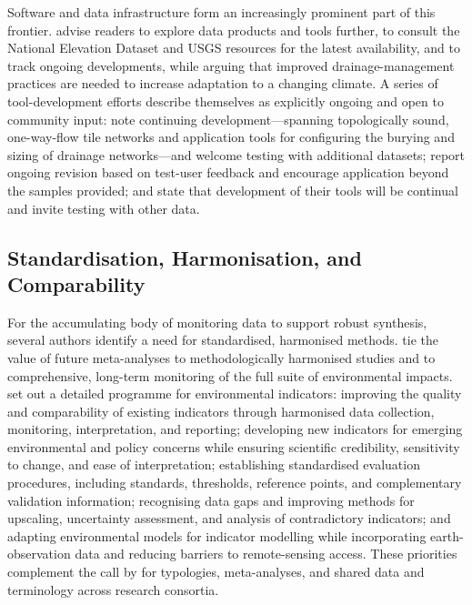 \documentclass[11pt]{article}
\begin{document}
Software and data infrastructure form an increasingly prominent part of this frontier. \textcite{Shedekar2018} advise readers to explore data products and tools further, to consult the National Elevation Dataset and USGS resources for the latest availability, and to track ongoing developments, while arguing that improved drainage-management practices are needed to increase adaptation to a changing climate. A series of tool-development efforts describe themselves as explicitly ongoing and open to community input: \textcite{Falasy2025} note continuing development---spanning topologically sound, one-way-flow tile networks and application tools for configuring the burying and sizing of drainage networks---and welcome testing with additional datasets; \textcite{Falasy2025b} report ongoing revision based on test-user feedback and encourage application beyond the samples provided; and \textcite{Falasy2024} state that development of their tools will be continual and invite testing with other data.

\subsection{Standardisation, Harmonisation, and Comparability}

For the accumulating body of monitoring data to support robust synthesis, several authors identify a need for standardised, harmonised methods. \textcite{Wu2025} tie the value of future meta-analyses to methodologically harmonised studies and to comprehensive, long-term monitoring of the full suite of environmental impacts. \textcite{Zhang2018} set out a detailed programme for environmental indicators: improving the quality and comparability of existing indicators through harmonised data collection, monitoring, interpretation, and reporting; developing new indicators for emerging environmental and policy concerns while ensuring scientific credibility, sensitivity to change, and ease of interpretation; establishing standardised evaluation procedures, including standards, thresholds, reference points, and complementary validation information; recognising data gaps and improving methods for upscaling, uncertainty assessment, and analysis of contradictory indicators; and adapting environmental models for indicator modelling while incorporating earth-observation data and reducing barriers to remote-sensing access. These priorities complement the call by \textcite{Rogger2017} for typologies, meta-analyses, and shared data and terminology across research consortia.
\end{document}
